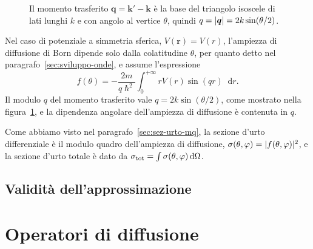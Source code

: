\documentclass[a4paper,fleqn,twoside,12pt]{article}
\renewcommand{\phi}{\varphi}
\newcommand*{\dd}{\mathop{}\!\mathrm{d}} %
\DeclarePairedDelimiter{\abs}{\lvert}{\rvert}
\newcommand*{\versor}[1]{\hat{\bm{#1}}}
\begin{document}
\begin{SCfigure}
  \centering
  \caption{Il momento trasferito $\bm{q} = \bm{k}' - \bm{k}$ è la base del
    triangolo isoscele di lati lunghi $k$ e con angolo al vertice $\theta$,
    quindi $q = \abs{\bm{q}} = 2k\sin(\theta/2)$.}
\label{fig:momento-trasferito}
\end{SCfigure}
Nel caso di potenziale a simmetria sferica, $V(\bm{r}) = V(r)$, l'ampiezza di
diffusione di Born dipende solo dalla colatitudine $\theta$, per quanto detto
nel paragrafo~\ref{sec:sviluppo-onde}, e assume l'espressione
\begin{equation}
  f(\theta) = -\frac{2m}{q\hslash^{2}} \int_{0}^{+\infty} rV(r) \sin(qr) \dd r.
\end{equation}
Il modulo $q$ del momento trasferito vale $q = 2k\sin(\theta/2)$, come mostrato
nella figura~\ref{fig:momento-trasferito}, e la dipendenza angolare
dell'ampiezza di diffusione è contenuta in $q$.

Come abbiamo visto nel paragrafo~\ref{sec:sez-urto-mq}, la sezione d'urto
differenziale è il modulo quadro dell'ampiezza di diffusione,
$\sigma(\theta,\phi) = \abs{f(\theta,\phi)}^{2}$, e la sezione d'urto totale è
dato da $\sigma_{\textup{tot}} = \int \sigma(\theta,\phi) \dd\Omega$.

\subsection{Validità dell'approssimazione}
\label{sec:validita-born}


\section{Operatori di diffusione}
\label{sec:operatori-diffusione}

{}
\printbibliography
\end{document}
